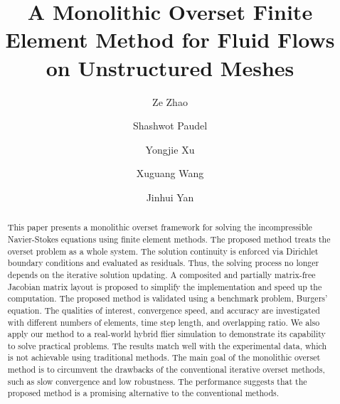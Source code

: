 \documentclass[preprint,12pt,sort&compress]{elsarticle}
\theoremstyle{definition}%
\begin{document}
\begin{frontmatter}
\title{A Monolithic Overset Finite Element Method for Fluid Flows on Unstructured Meshes}
\author[uiuc]{Ze Zhao}
\author[uiuc]{Shashwot Paudel}
\author[uiuc]{Yongjie Xu}
\author[uiuc,hku]{Xuguang Wang}
\author[uiuc]{Jinhui Yan}
\address[uiuc]{Department of Civil and Environmental Engineering, University of Illinois at Urbana-Champaign}
\address[hku]{Department of Civil Engineering, The University of Hong Kong}

\begin{abstract}
This paper presents a monolithic overset framework for solving the incompressible Navier-Stokes equations using finite element methods.
The proposed method treats the overset problem as a whole system.
The solution continuity is enforced via Dirichlet boundary conditions and evaluated as residuals. 
Thus, the solving process no longer depends on the iterative solution updating.
A composited and partially matrix-free Jacobian matrix layout is proposed to simplify the implementation and speed up the computation.
The proposed method is validated using a benchmark problem, Burgers' equation. 
The qualities of interest, convergence speed, and accuracy are investigated with different numbers of elements, time step length, and overlapping ratio.
We also apply our method to a real-world hybrid flier simulation to demonstrate its capability to solve practical problems.
The results match well with the experimental data, which is not achievable using traditional methods.
The main goal of the monolithic overset method is to circumvent the drawbacks of the conventional iterative overset methods, such as slow convergence and low robustness.
The performance suggests that the proposed method is a promising alternative to the conventional methods.
\end{abstract}

\end{frontmatter}
\end{document}
